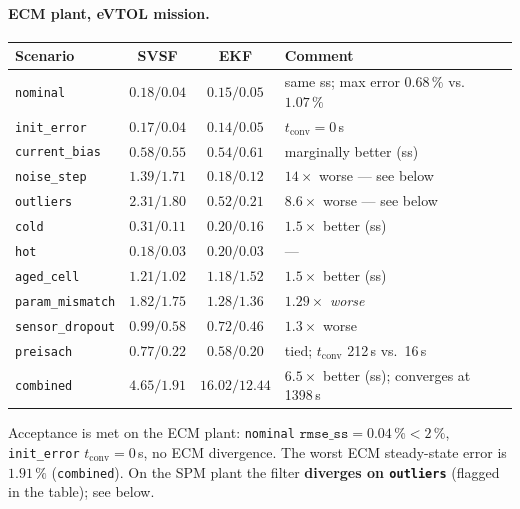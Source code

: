 \paragraph{ECM plant, eVTOL mission.}
\begin{center}\small
\begin{tabular}{@{}lccl@{}}
\toprule
Scenario & SVSF & EKF & Comment\\
\midrule
\texttt{nominal}        & $0.18/\mathbf{0.04}$ & $0.15/0.05$ & same ss; max error $0.68\,\%$ vs.\ $1.07\,\%$\\
\texttt{init\_error}    & $0.17/\mathbf{0.04}$ & $0.14/0.05$ & $t_\mathrm{conv}=0$\,s\\
\texttt{current\_bias}  & $0.58/\mathbf{0.55}$ & $0.54/0.61$ & marginally better (ss)\\
\texttt{noise\_step}    & $1.39/1.71$ & $0.18/0.12$ & $14\times$ worse --- see below\\
\texttt{outliers}       & $2.31/1.80$ & $0.52/0.21$ & $8.6\times$ worse --- see below\\
\texttt{cold}           & $0.31/\mathbf{0.11}$ & $0.20/0.16$ & $1.5\times$ better (ss)\\
\texttt{hot}            & $0.18/0.03$ & $0.20/0.03$ & ---\\
\texttt{aged\_cell}     & $1.21/\mathbf{1.02}$ & $1.18/1.52$ & $1.5\times$ better (ss)\\
\texttt{param\_mismatch}& $1.82/1.75$ & $1.28/1.36$ & $1.29\times$ \emph{worse}\\
\texttt{sensor\_dropout}& $0.99/0.58$ & $0.72/0.46$ & $1.3\times$ worse\\
\texttt{preisach}       & $0.77/0.22$ & $0.58/0.20$ & tied; $t_\mathrm{conv}$ 212\,s vs.\ 16\,s\\
\texttt{combined}       & $\mathbf{4.65/1.91}$ & $16.02/12.44$ & $\mathbf{6.5\times}$ better (ss); converges at 1398\,s\\
\bottomrule
\end{tabular}
\end{center}
Acceptance is met on the ECM plant: \texttt{nominal} $\texttt{rmse\_ss}=0.04\,\%<2\,\%$,
\texttt{init\_error} $t_\mathrm{conv}=0$\,s, no ECM divergence.  The worst ECM steady-state error is
$1.91\,\%$ (\texttt{combined}).  On the SPM plant the filter \textbf{diverges on \texttt{outliers}}
(flagged in the table); see below.

